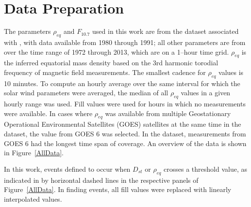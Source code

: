 \documentclass[10pt,twocolumn]{article}
\begin{document}



\section{Data Preparation}

The parameters $\rho_{eq}$ and $F_{10.7}$ used in this work are from the dataset associated with \cite{Denton}, with data available from 1980 through 1991; all other parameters are from \cite{Reconstruction} over the time range of 1972 through 2013, which are on a 1--hour time grid. $\rho_{eq}$ is the inferred equatorial mass density based on the 3rd harmonic torodial frequency of magnetic field measurements.  The smallest cadence for $\rho_{eq}$ values is 10 minutes.  To compute an hourly average over the same interval for which the solar wind parameters were averaged, the median of all $\rho_{eq}$ values in a given hourly range was used.  Fill values were used for hours in which no measurements were available.  In cases where $\rho_{eq}$ was available from multiple Geostationary Operational Environmental Satellites (GOES) satellites at the same time in the \cite{Denton} dataset, the value from GOES 6 was selected.  In the dataset, measurements from GOES 6 had the longest time span of coverage.  An overview of the data is shown in Figure~\ref{AllData}.


In this work, events defined to occur when $D_{st}$ or $\rho_{eq}$ crosses a threshold value, as indicated in by horizontal dashed lines in the respective panels of Figure~\ref{AllData}.  In finding events, all fill values were replaced with linearly interpolated values. 
\end{document}

